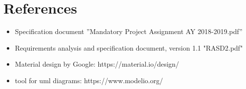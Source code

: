\chapter{References}\label{c:ref}

\begin{itemize}
\item Specification document ”Mandatory Project Assignment AY 2018-2019.pdf”
\item Requirements analysis and specification document, version 1.1 "RASD2.pdf"
\item Material design by Google: https://material.io/design/
\item tool for uml diagrams: https://www.modelio.org/
\end{itemize}